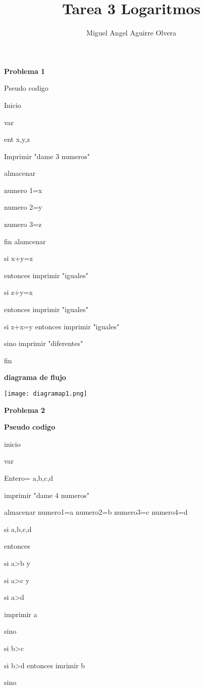 \documentclass[11pt,a4paper]{article}
\author{Miguel Angel Aguirre Olvera}
\title{Tarea 3 Logaritmos}
\begin{document}
 
\maketitle 
\begin{multicols}{2}
\begin{center}
\textbf{Problema 1}
\end{center}
Pseudo codigo

Inicio

var

ent x,y,z

Imprimir "dame 3 numeros"

almacenar

numero 1=x

numero 2=y

numero 3=z

fin alamcenar 

si x+y=z

entonces imprimir "iguales"

si z+y=x

entonces imprimir "iguales"

si z+x=y 
entonces imprimir "iguales"

sino imprimir "diferentes"

 
fin  

\textbf{diagrama de flujo}

\texttt{[image: diagramap1.png]} 



\begin{center}

\textbf{Problema 2}

\end{center}
\textbf{Pseudo codigo}

inicio

var 

Entero= a,b,c,d

imprimir "dame 4 numeros"

almacenar 
numero1=a
numero2=b
numero3=c
numero4=d


si a,b,c,d

entonces

si a>b y 

si a>c y 

si a>d 

imprimir a

sino 

si b>c

si b>d entonces imrimir b

sino 


\end{multicols}
\end{document}
